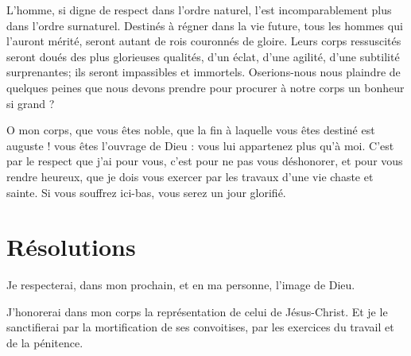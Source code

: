 \documentclass[instructions.tex]{subfiles}
\begin{document}
\tertio L’homme, si digne de respect dans l’ordre naturel, l’est incomparablement plus dans l’ordre surnaturel. Destinés à régner dans la vie future, tous les hommes qui l’auront mérité, seront autant de rois couronnés de gloire. Leurs corps ressuscités seront doués des plus glorieuses qualités, d’un éclat, d’une agilité, d’une subtilité surprenantes; ils seront impassibles et immortels. Oserions-nous nous plaindre de quelques peines que nous devons prendre pour procurer à notre corps un bonheur si grand ?
 
O mon corps, que vous êtes noble, que la fin à laquelle vous êtes destiné est auguste ! vous êtes l’ouvrage de Dieu : vous lui appartenez plus qu’à moi. C’est par le respect que j’ai pour vous, c’est pour ne pas vous déshonorer, et pour vous rendre heureux, que je dois vous exercer par les travaux d’une vie chaste et sainte. Si vous souffrez ici-bas, vous serez un jour glorifié.
 
\section{Résolutions}
 
\primo Je respecterai, dans mon prochain, et en ma personne, l’image de Dieu.
 
\secundo J’honorerai dans mon corps la représentation de celui de Jésus-Christ. Et je le sanctifierai par la mortification de ses convoitises, par les exercices du travail et de la pénitence. 

 
\end{document}
